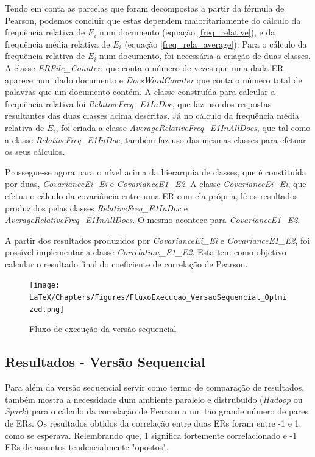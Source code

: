 Tendo em conta as parcelas que foram decompostas a partir da fórmula de Pearson, podemos concluir que estas dependem maioritariamente do cálculo da frequência relativa de $E_{i}$ num documento (equação \ref{freq_relative}), e da frequência média relativa de $E_{i}$ (equação \ref{freq_rela_average}). Para o cálculo da frequência relativa de $E_{i}$ num documento, foi necessária a criação de duas classes. A classe \textit{ERFile\_Counter}, que conta o número de vezes que uma dada ER aparece num dado documento e \textit{DocsWordCounter} que conta o número total de palavras que um documento contém. A classe construída para calcular a frequência relativa foi \textit{RelativeFreq\_E1InDoc}, que faz uso dos respostas resultantes das duas classes acima descritas. Já no cálculo da frequência média relativa de $E_{i}$, foi criada a classe \textit{AverageRelativeFreq\_E1InAllDocs}, que tal como a classe \textit{RelativeFreq\_E1InDoc}, também faz uso das mesmas classes para efetuar os seus cálculos.

Prossegue-se agora para o nível acima da hierarquia de classes, que é constituída por duas, \textit{CovarianceEi\_Ei} e \textit{CovarianceE1\_E2}. A classe \textit{CovarianceEi\_Ei}, que efetua o cálculo da covariância entre uma ER com ela própria, lê os resultados produzidos pelas classes \textit{RelativeFreq\_E1InDoc} e \textit{AverageRelativeFreq\_E1InAllDocs}. O mesmo acontece para \textit{CovarianceE1\_E2}. 

A partir dos resultados produzidos por \textit{CovarianceEi\_Ei} e \textit{CovarianceE1\_E2}, foi possível implementar a classe \textit{Correlation\_E1\_E2}. Esta tem como objetivo calcular o resultado final do coeficiente de correlação de Pearson.

\begin{figure}[htbp]
	\centering
	\texttt{[image: LaTeX/Chapters/Figures/FluxoExecucao\_VersaoSequencial\_Optmized.png]}
  \caption{Fluxo de execução da versão sequencial}
  \label{fig:fluxo_execucao_prototipo}
\end{figure}

\subsection{Resultados - Versão Sequencial}
Para além da versão sequencial servir como termo de comparação de resultados, também mostra a necessidade dum ambiente paralelo  e distrubuído (\textit{Hadoop} ou \textit{Spark}) para o cálculo da  correlação de Pearson a um tão grande número de pares de ERs. Os resultados obtidos da correlação entre duas ERs foram entre -1 e 1, como se esperava. Relembrando que, 1 significa fortemente correlacionado e -1 ERs de assuntos tendencialmente "opostos".


